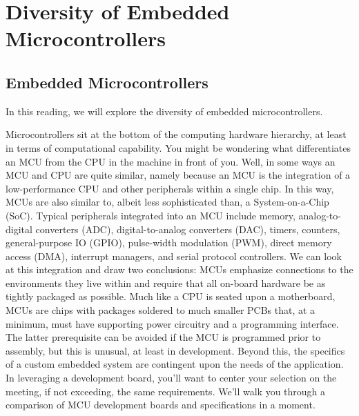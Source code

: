 \section{Diversity of Embedded Microcontrollers}

\subsection{Embedded Microcontrollers}
In this reading, we will explore the diversity of embedded microcontrollers.

Microcontrollers sit at the bottom of the computing hardware hierarchy, at least in terms of computational capability. You might be wondering what differentiates an MCU from the CPU in the machine in front of you. Well, in some ways an MCU and CPU are quite similar, namely because an MCU is the integration of a low-performance CPU and other peripherals within a single chip. In this way, MCUs are also similar to, albeit less sophisticated than, a System-on-a-Chip (SoC). Typical peripherals integrated into an MCU include memory, analog-to-digital converters (ADC), digital-to-analog converters (DAC), timers, counters, general-purpose IO (GPIO), pulse-width modulation (PWM), direct memory access (DMA), interrupt managers, and serial protocol controllers. We can look at this integration and draw two conclusions: MCUs emphasize connections to the environments they live within and require that all on-board hardware be as tightly packaged as possible. Much like a CPU is seated upon a motherboard, MCUs are chips with packages soldered to much smaller PCBs that, at a minimum, must have supporting power circuitry and a programming interface. The latter prerequisite can be avoided if the MCU is programmed prior to assembly, but this is unusual, at least in development. Beyond this, the specifics of a custom embedded system are contingent upon the needs of the application. In leveraging a development board, you’ll want to center your selection on the meeting, if not exceeding, the same requirements. We’ll walk you through a comparison of MCU development boards and specifications in a moment.

